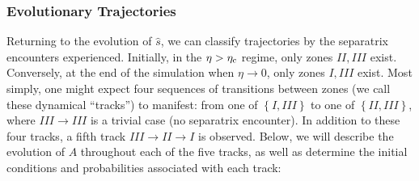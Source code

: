 \documentclass[
        fleqn,
        usenatbib,
        referee,
    ]{mnras}
\newcommand*{\z}[1]{\left\{#1\right\}}
\begin{document}
\subsubsection{Evolutionary Trajectories}\label{sss:evol_traj}

Returning to the evolution of $\hat{s}$, we can classify trajectories by the
separatrix encounters experienced. Initially, in the $\eta > \eta_{\rm c}$ regime,
only zones $II, III$ exist. Conversely, at the end of the simulation when $\eta
\to 0$, only zones $I, III$ exist. Most simply, one might expect four sequences
of transitions between zones (we call these dynamical ``tracks'') to manifest:
from one of $\z{I, III}$ to one of $\z{II, III}$, where $III \to III$ is a
trivial case (no separatrix encounter). In addition to these four tracks, a
fifth track $III \to II \to I$ is observed. Below, we will describe the
evolution of $A$ throughout each of the five tracks, as well as determine the
initial conditions and probabilities associated with each track:
\end{document}
